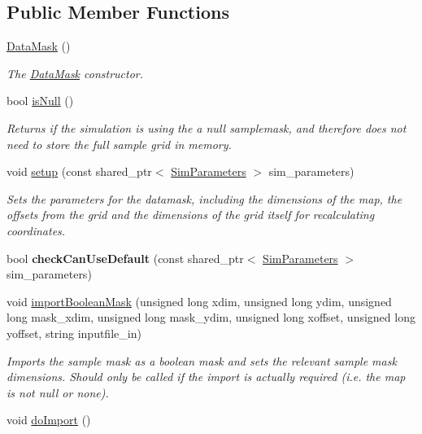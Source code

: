\subsection*{Public Member Functions}
\begin{DoxyCompactItemize}
\item 
\hyperlink{class_data_mask_ae89a953b8200f027d44dc74fa748852b}{Data\+Mask} ()\hypertarget{class_data_mask_ae89a953b8200f027d44dc74fa748852b}{}\label{class_data_mask_ae89a953b8200f027d44dc74fa748852b}

\begin{DoxyCompactList}\small\item\em The \hyperlink{class_data_mask}{Data\+Mask} constructor. \end{DoxyCompactList}\item 
bool \hyperlink{class_data_mask_a9aa4ee43e6c20f4b7c3e8404ee12345b}{is\+Null} ()
\begin{DoxyCompactList}\small\item\em Returns if the simulation is using the a null samplemask, and therefore does not need to store the full sample grid in memory. \end{DoxyCompactList}\item 
void \hyperlink{class_data_mask_aa0904fd16e834eaba37173a68743ade5}{setup} (const shared\+\_\+ptr$<$ \hyperlink{struct_sim_parameters}{Sim\+Parameters} $>$ sim\+\_\+parameters)
\begin{DoxyCompactList}\small\item\em Sets the parameters for the datamask, including the dimensions of the map, the offsets from the grid and the dimensions of the grid itself for recalculating coordinates. \end{DoxyCompactList}\item 
bool {\bfseries check\+Can\+Use\+Default} (const shared\+\_\+ptr$<$ \hyperlink{struct_sim_parameters}{Sim\+Parameters} $>$ sim\+\_\+parameters)\hypertarget{class_data_mask_a3286a3145218718fde493799d060a7e0}{}\label{class_data_mask_a3286a3145218718fde493799d060a7e0}

\item 
void \hyperlink{class_data_mask_aac63b47c3688db359760f6134d30f239}{import\+Boolean\+Mask} (unsigned long xdim, unsigned long ydim, unsigned long mask\+\_\+xdim, unsigned long mask\+\_\+ydim, unsigned long xoffset, unsigned long yoffset, string inputfile\+\_\+in)
\begin{DoxyCompactList}\small\item\em Imports the sample mask as a boolean mask and sets the relevant sample mask dimensions. Should only be called if the import is actually required (i.\+e. the map is not null or none). \end{DoxyCompactList}\item 
void \hyperlink{class_data_mask_a85f7b85bb4ac54aa884a8a06f1d35d1b}{do\+Import} ()\hypertarget{class_data_mask_a85f7b85bb4ac54aa884a8a06f1d35d1b}{}\label{class_data_mask_a85f7b85bb4ac54aa884a8a06f1d35d1b}


\end{DoxyCompactItemize}
